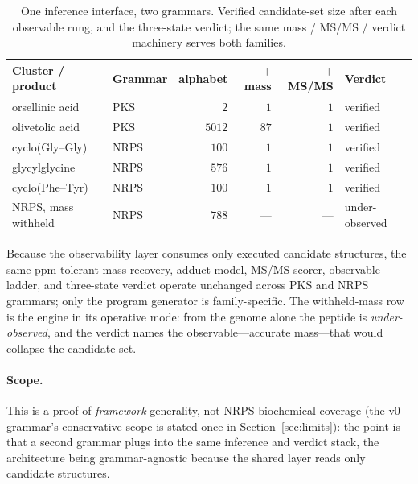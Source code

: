 \documentclass[11pt]{article}
\theoremstyle{definition}
\begin{document}
\begin{table}[h]
\centering\small
\caption{One inference interface, two grammars. Verified candidate-set size after each observable
rung, and the three-state verdict; the same mass / MS/MS / verdict machinery serves both families.}
\label{tab:crossgrammar}
\begin{tabular}{@{}llrrrl@{}}
\toprule
Cluster / product & Grammar & alphabet & $+$mass & $+$MS/MS & Verdict \\
\midrule
orsellinic acid     & PKS  & $2$    & $1$  & $1$ & verified \\
olivetolic acid     & PKS  & $5012$ & $87$ & $1$ & verified \\
cyclo(Gly--Gly)     & NRPS & $100$  & $1$  & $1$ & verified \\
glycylglycine       & NRPS & $576$  & $1$  & $1$ & verified \\
cyclo(Phe--Tyr)     & NRPS & $100$  & $1$  & $1$ & verified \\
NRPS, mass withheld & NRPS & $788$  & ---  & --- & under-observed \\
\bottomrule
\end{tabular}
\end{table}

Because the observability layer consumes only executed candidate structures, the same ppm-tolerant
mass recovery, adduct model, MS/MS scorer, observable ladder, and three-state verdict operate
unchanged across PKS and NRPS grammars; only the program generator is family-specific. The
withheld-mass row is the engine in its
operative mode: from the genome alone the peptide is \emph{under-observed}, and the verdict names the
observable---accurate mass---that would collapse the candidate set.

\paragraph{Scope.} This is a proof of \emph{framework} generality, not NRPS biochemical coverage
(the v0 grammar's conservative scope is stated once in Section~\ref{sec:limits}): the point is that
a second grammar plugs into the same inference and verdict stack, the architecture being
grammar-agnostic because the shared layer reads only candidate structures.
\end{document}
